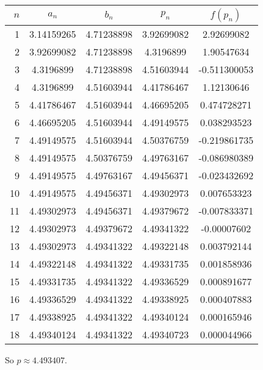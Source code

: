 \documentclass[../../Assignments.tex]{subfiles}
\begin{document}
\begin{exercise}
\begin{enumerate}[label=(\alph*)]
            \begin{longtable}{r S[table-format=1.8] S[table-format=1.8] S[table-format=1.8] S[table-format=-1.9]}
                \toprule
                \(n\)  &   {\(a_n\)}   &   {\(b_n\)}   &   {\(p_n\)}   &  {\(f(p_n)\)}  \\
                  &  3.14159265   &  4.71238898   &  3.92699082   &   2.92699082   \\
                    2  &  3.92699082   &  4.71238898   &  4.3196899    &   1.90547634   \\
                    3  &  4.3196899    &  4.71238898   &  4.51603944   &  -0.511300053  \\
                    4  &  4.3196899    &  4.51603944   &  4.41786467   &   1.12130646   \\
                    5  &  4.41786467   &  4.51603944   &  4.46695205   &   0.474728271  \\
                    6  &  4.46695205   &  4.51603944   &  4.49149575   &   0.038293523  \\
                    7  &  4.49149575   &  4.51603944   &  4.50376759   &  -0.219861735  \\
                    8  &  4.49149575   &  4.50376759   &  4.49763167   &  -0.086980389  \\
                    9  &  4.49149575   &  4.49763167   &  4.49456371   &  -0.023432692  \\
                   10  &  4.49149575   &  4.49456371   &  4.49302973   &   0.007653323  \\
                   11  &  4.49302973   &  4.49456371   &  4.49379672   &  -0.007833371  \\
                   12  &  4.49302973   &  4.49379672   &  4.49341322   &  -0.00007602   \\
                   13  &  4.49302973   &  4.49341322   &  4.49322148   &   0.003792144  \\
                   14  &  4.49322148   &  4.49341322   &  4.49331735   &   0.001858936  \\
                   15  &  4.49331735   &  4.49341322   &  4.49336529   &   0.000891677  \\
                   16  &  4.49336529   &  4.49341322   &  4.49338925   &   0.000407883  \\
                   17  &  4.49338925   &  4.49341322   &  4.49340124   &   0.000165946  \\
                   18  &  4.49340124   &  4.49341322   &  4.49340723   &   0.000044966  \\
                \bottomrule
            \end{longtable}

            So \(p \approx \num{4.493407}\).
    \end{enumerate}
\end{exercise}
\end{document}
